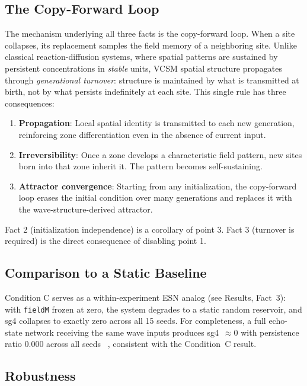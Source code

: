 \documentclass[11pt,twocolumn]{article}
\begin{document}
\subsection{The Copy-Forward Loop}

The mechanism underlying all three facts is the copy-forward loop. When a site
collapses, its replacement samples the field memory of a neighboring site.
Unlike classical reaction-diffusion systems, where spatial patterns are sustained
by persistent concentrations in \emph{stable} units, VCSM spatial structure
propagates through \emph{generational turnover}: structure is maintained by what
is transmitted at birth, not by what persists indefinitely at each site.
This single rule has three consequences:

\begin{enumerate}
  \item \textbf{Propagation}: Local spatial identity is transmitted to each new
        generation, reinforcing zone differentiation even in the absence of current
        input.
  \item \textbf{Irreversibility}: Once a zone develops a characteristic field
        pattern, new sites born into that zone inherit it. The pattern becomes
        self-sustaining.
  \item \textbf{Attractor convergence}: Starting from any initialization, the
        copy-forward loop erases the initial condition over many generations and
        replaces it with the wave-structure-derived attractor.
\end{enumerate}

Fact 2 (initialization independence) is a corollary of point 3.
Fact 3 (turnover is required) is the direct consequence of disabling point 1.

\subsection{Comparison to a Static Baseline}

Condition C serves as a within-experiment ESN analog (see Results, Fact~3):
with \texttt{fieldM} frozen at zero, the system degrades to a static random
reservoir, and sg4 collapses to exactly zero across all 15 seeds.
For completeness, a full echo-state network receiving the same wave inputs
produces sg4~$\approx 0$ with persistence ratio 0.000 across all seeds
~\cite{aubin2026propagation}, consistent with the Condition~C result.

\subsection{Robustness}
\end{document}

